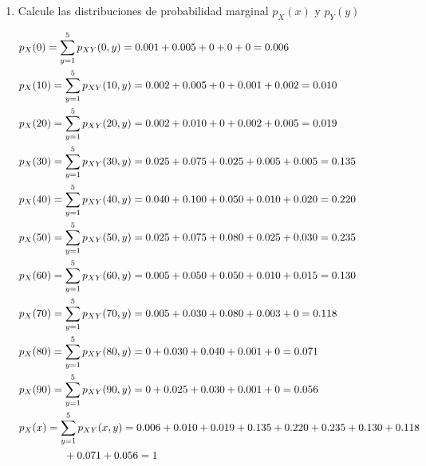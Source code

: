 \documentclass[12pt]{report}
\newcommand{\linejump}{\hfill \break}
\begin{document}
  \linejump
  \begin{enumerate}
    \item Calcule las distribuciones de probabilidad marginal $p_X(x)$ y $p_Y(y)$
    
    \begin{align*}
      &p_X(0) = \sum_{y=1}^5 p_{XY}(0, y) = 0.001 + 0.005 + 0 + 0 + 0 = 0.006 \\
      &p_X(10) = \sum_{y=1}^5 p_{XY}(10, y) = 0.002 + 0.005 + 0 + 0.001 + 0.002 = 0.010 \\
      &p_X(20) = \sum_{y=1}^5 p_{XY}(20, y) = 0.002 + 0.010 + 0 + 0.002 + 0.005 = 0.019 \\
      &p_X(30) = \sum_{y=1}^5 p_{XY}(30, y) = 0.025 + 0.075 + 0.025 + 0.005 + 0.005 = 0.135 \\
      &p_X(40) = \sum_{y=1}^5 p_{XY}(40, y) = 0.040 + 0.100 + 0.050 + 0.010 + 0.020 = 0.220 \\
      &p_X(50) = \sum_{y=1}^5 p_{XY}(50, y) = 0.025 + 0.075 + 0.080 + 0.025 + 0.030 = 0.235 \\
      &p_X(60) = \sum_{y=1}^5 p_{XY}(60, y) = 0.005 + 0.050 + 0.050 + 0.010 + 0.015 = 0.130 \\
      &p_X(70) = \sum_{y=1}^5 p_{XY}(70, y) = 0.005 + 0.030 + 0.080 + 0.003 + 0 = 0.118 \\
      &p_X(80) = \sum_{y=1}^5 p_{XY}(80, y) = 0 + 0.030 + 0.040 + 0.001 + 0 = 0.071 \\
      &p_X(90) = \sum_{y=1}^5 p_{XY}(90, y) = 0 + 0.025 + 0.030 + 0.001 + 0 = 0.056 \\
      &p_X(x) = \sum_{y=1}^5 p_{XY}(x, y) = 0.006 + 0.010 + 0.019 + 0.135 + 0.220 + 0.235 + 0.130 + 0.118 \\
      &\hspace*{1.5cm} + 0.071 + 0.056 = 1
    \end{align*}


\end{enumerate}
\end{document}
